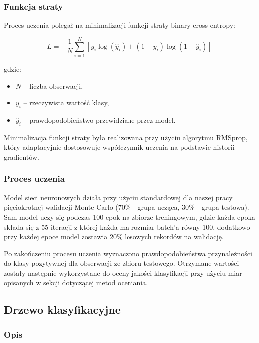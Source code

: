 \documentclass[twoside]{customStyle}
\begin{document}
\subsubsection{Funkcja straty}

Proces uczenia polegał na minimalizacji funkcji straty binary cross-entropy:

\begin{equation}
L = -\frac{1}{N}\sum_{i=1}^{N}
\left[
y_i \log(\hat{y}_i)
+
(1-y_i)\log(1-\hat{y}_i)
\right]
\end{equation}

gdzie:
\begin{itemize}
\item $N$ -- liczba obserwacji,
\item $y_i$ -- rzeczywista wartość klasy,
\item $\hat{y}_i$ -- prawdopodobieństwo przewidziane przez model.
\end{itemize}

Minimalizacja funkcji straty była realizowana przy użyciu algorytmu RMSprop, który adaptacyjnie dostosowuje współczynnik uczenia na podstawie historii gradientów.

\subsubsection{Proces uczenia}

Model sieci neuronowych działa  przy użyciu standardowej dla naszej pracy pięciokrotnej walidacji Monte Carlo (70\% - grupa ucząca, 30\% - grupa testowa). Sam model uczy się podczas 100 epok na zbiorze treningowym, gdzie każda epoka składa się z 55 iteracji z której każda ma rozmiar batch'a równy 100, dodatkowo przy każdej epoce model zostawia 20\% losowych rekordów na walidację.

Po zakończeniu procesu uczenia wyznaczono prawdopodobieństwa przynależności do klasy pozytywnej dla obserwacji ze zbioru testowego. Otrzymane wartości zostały następnie wykorzystane do oceny jakości klasyfikacji przy użyciu miar opisanych w sekcji dotyczącej metod oceniania.

\subsection{Drzewo klasyfikacyjne}

\subsubsection{Opis}
\end{document}
